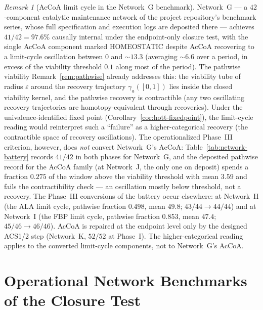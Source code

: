 \documentclass[11pt,a4paper]{article}
\theoremstyle{plain}
\theoremstyle{definition}
\theoremstyle{remark}
\newtheorem{remark}[theorem]{Remark}
\begin{document}
\begin{remark}[AcCoA limit cycle in the Network~G benchmark]
\label{rem:netG-accola-cycle}
Network~G --- a $42$-component catalytic maintenance network of the
project repository's benchmark series, whose full specification and
execution logs are deposited there --- achieves $41/42 = 97.6\%$
causally internal under the endpoint-only closure test, with the single
AcCoA component marked HOMEOSTATIC despite AcCoA recovering to a
limit-cycle oscillation between $0$ and $\sim 13.3$ (averaging $\sim
6.6$ over a period, in excess of the viability threshold $0.1$ along
most of the period). The pathwise viability Remark~\ref{rem:pathwise}
already addresses this: the viability tube of radius $\varepsilon$
around the recovery trajectory $\gamma_a([0,1])$ lies inside the closed
viability kernel, and the pathwise recovery is contractible (any two
oscillating recovery trajectories are homotopy-equivalent through
recoveries). Under the univalence-identified fixed point
(Corollary~\ref{cor:hott-fixedpoint}), the limit-cycle reading
would reinterpret such a ``failure'' as a higher-categorical
recovery (the contractible space of recovery oscillations). The
operationalized Phase~III criterion, however, does \emph{not}
convert Network~G's AcCoA: Table~\ref{tab:network-battery} records
$41/42$ in both phases for Network~G, and the deposited pathwise
record for the AcCoA family (at Network~J, the only one on
deposit) spends a fraction $0.275$ of the window above the
viability threshold with mean $3.59$ and fails the contractibility
check --- an oscillation mostly below threshold, not a recovery.
The Phase~III conversions of the battery occur elsewhere: at
Network~H (the ALA limit cycle, pathwise fraction $0.498$, mean
$49.8$; $43/44\to44/44$) and at Network~I (the FBP limit cycle,
pathwise fraction $0.853$, mean $47.4$; $45/46\to46/46$). AcCoA is
repaired at the endpoint level only by the designed ACS1/2 step
(Network~K, $52/52$ at Phase~I). The higher-categorical reading
applies to the converted limit-cycle components, not to
Network~G's AcCoA.
\end{remark}




\section{Operational Network Benchmarks of the Closure Test}
\label{sec:network-battery}
\end{document}
